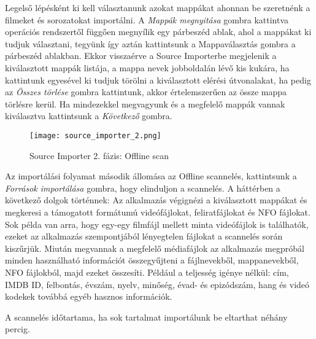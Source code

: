 Legelső lépésként ki kell választanunk azokat mappákat ahonnan be szeretnénk a filmeket és sorozatokat importálni. A {\it Mappák megnyitása} gombra kattintva operációs rendszertől függően megnyílik egy párbeszéd ablak, ahol a mappákat ki tudjuk választani, tegyünk így aztán kattintsunk a Mappaválasztás gombra a párbeszéd ablakban. Ekkor visszaérve a Source Importerbe megjelenik a kiválasztott mappák listája, a mappa nevek jobboldalán lévő kis kukára, ha kattintunk egyesével ki tudjuk törölni a kiválasztott elérési útvonalakat, ha pedig az {\it Összes törlése} gombra kattintunk, akkor értelemszerűen az össze mappa törlésre kerül. Ha mindezekkel megvagyunk és a megfelelő mappák vannak kiválasztva kattintsunk a {\it Következő} gombra.

\begin{figure}[H]
	\centering
	\texttt{[image: source\_importer\_2.png]}
	\caption{Source Importer 2. fázis: Offline scan}
	\label{fig:source_importer_2}
\end{figure}
Az importálási folyamat második állomása az Offline scannelés, kattintsunk a {\it Források importálása} gombra, hogy elinduljon a scannelés. A háttérben a következő dolgok történnek: Az alkalmazás végignézi a kiválasztott mappákat és megkeresi a támogatott formátumú videófájlokat, feliratfájlokat és NFO fájlokat. Sok példa van arra, hogy egy-egy filmfájl mellett minta videófájlok is találhatók, ezeket az alkalmazás szempontjából lényegtelen fájlokat a scannelés során kiszűrjük. Miután megvannak a megfelelő médiafájlok az alkalmazás megpróbál minden használható információt összegyűjteni a fájlnevekből, mappanevekből, NFO fájlokból, majd ezeket összesíti. Például a teljesség igénye nélkül: cím, IMDB ID, felbontás, évszám, nyelv, minőség, évad- és epizódszám, hang és videó kodekek továbbá egyéb hasznos információk.

A scannelés időtartama, ha sok tartalmat importálunk be eltarthat néhány percig.

